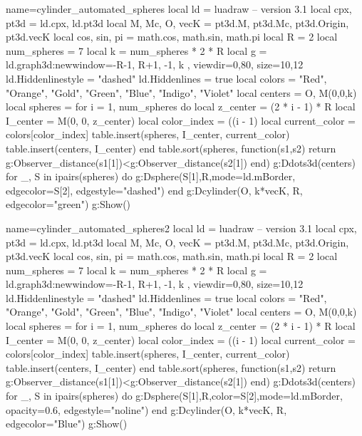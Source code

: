 \documentclass[border=2 mm ]{standalone}
\begin{document}
\begin{luadraw}{name=cylinder_automated_spheres}
local ld = luadraw -- version 3.1
local cpx, pt3d = ld.cpx, ld.pt3d
local M, Mc, O, vecK = pt3d.M, pt3d.Mc, pt3d.Origin,  pt3d.vecK
local cos, sin, pi = math.cos, math.sin,  math.pi
local R = 2           
local num_spheres = 7
local k = num_spheres * 2 * R  
local g = ld.graph3d:new{window={-R-1, R+1, -1, k }, viewdir={0,80}, size={10,12}}
ld.Hiddenlinestyle = "dashed"
ld.Hiddenlines = true
local colors = {"Red", "Orange", "Gold", "Green", "Blue", "Indigo", "Violet"}
local centers = {O, M(0,0,k)}
local spheres = {}
for i = 1, num_spheres do
    local z_center = (2 * i - 1) * R
    local I_center = M(0, 0, z_center)
    local color_index = ((i - 1) %
    local current_color = colors[color_index]
    table.insert(spheres, {I_center, current_color})
    table.insert(centers, I_center)
end
table.sort(spheres, function(s1,s2) return g:Observer_distance(s1[1])<g:Observer_distance(s2[1]) end)
g:Ddots3d(centers)
for _, S in ipairs(spheres) do
    g:Dsphere(S[1],R,{mode=ld.mBorder, edgecolor=S[2], edgestyle="dashed"})
end
g:Dcylinder(O, k*vecK, R, {edgecolor="green"}) 
g:Show()
\end{luadraw}


\begin{luadraw}{name=cylinder_automated_spheres2}
local ld = luadraw -- version 3.1
local cpx, pt3d = ld.cpx, ld.pt3d
local M, Mc, O, vecK = pt3d.M, pt3d.Mc, pt3d.Origin,  pt3d.vecK
local cos, sin, pi = math.cos, math.sin,  math.pi
local R = 2           
local num_spheres = 7
local k = num_spheres * 2 * R  
local g = ld.graph3d:new{window={-R-1, R+1, -1, k }, viewdir={0,80}, size={10,12}}
ld.Hiddenlinestyle = "dashed"
ld.Hiddenlines = true
local colors = {"Red", "Orange", "Gold", "Green", "Blue", "Indigo", "Violet"}
local centers = {O, M(0,0,k)}
local spheres = {}
for i = 1, num_spheres do
    local z_center = (2 * i - 1) * R
    local I_center = M(0, 0, z_center)
    local color_index = ((i - 1) %
    local current_color = colors[color_index]
    table.insert(spheres, {I_center, current_color})
    table.insert(centers, I_center)
end
table.sort(spheres, function(s1,s2) return g:Observer_distance(s1[1])<g:Observer_distance(s2[1]) end)
g:Ddots3d(centers)
for _, S in ipairs(spheres) do
    g:Dsphere(S[1],R,{color=S[2],mode=ld.mBorder, opacity=0.6, edgestyle="noline"})
end
g:Dcylinder(O, k*vecK, R, {edgecolor="Blue"}) 
g:Show()
\end{luadraw}
\end{document}
